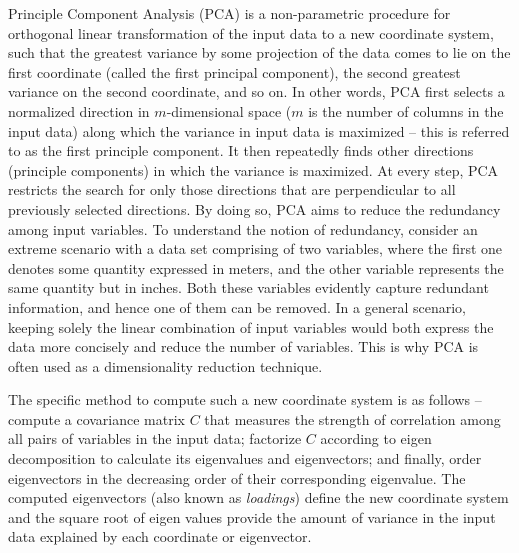 
Principle Component Analysis (PCA) is a non-parametric procedure for orthogonal linear transformation of the input data to a new coordinate system, such that the greatest variance by some projection of the data comes to lie on the first coordinate (called the first principal component), the second greatest variance on the second coordinate, and so on. In other words, PCA first selects a normalized direction in $m$-dimensional space ($m$ is the number of columns in the input data) along which the variance in input data is maximized -- this is referred to as the first principle component. It then repeatedly finds other directions (principle components) in which the variance is maximized. At every step, PCA restricts the search for only those directions that are perpendicular to all previously selected directions. By doing so, PCA aims to reduce the redundancy among input variables. To understand the notion of redundancy, consider an extreme scenario with a data set comprising of two variables, where the first one denotes some quantity expressed in meters, and the other variable represents the same quantity but in inches. Both these variables evidently capture redundant information, and hence one of them can be removed. In a general scenario, keeping solely the linear combination of input variables would both express the data more concisely and reduce the number of variables. This is why PCA is often used as a dimensionality reduction technique.

The specific method to compute such a new coordinate system is as follows -- compute a covariance matrix $C$ that measures the strength of correlation among all pairs of variables in the input data; factorize $C$ according to eigen decomposition to calculate its eigenvalues and eigenvectors; and finally, order eigenvectors in the decreasing order of their corresponding eigenvalue. The computed eigenvectors (also known as {\em loadings}) define the new coordinate system and the square root of eigen values provide the amount of variance in the input data explained by each coordinate or eigenvector. 
\\

